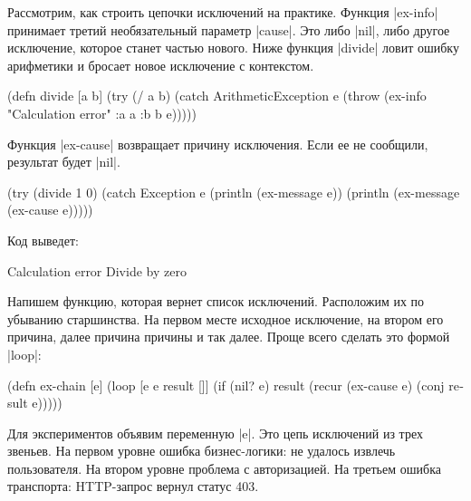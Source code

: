 Рассмотрим, как строить цепочки исключений на практике. Функция \spverb|ex-info|
принимает третий необязательный параметр \spverb|cause|. Это либо \spverb|nil|,
либо другое исключение, которое станет частью нового. Ниже функция
\spverb|divide| ловит ошибку арифметики и бросает новое исключение с контекстом.

\label{re-throw-example}

\begin{english}
  \begin{clojure}
(defn divide [a b]
  (try
    (/ a b)
    (catch ArithmeticException e
      (throw (ex-info
              "Calculation error"
              {:a a :b b}
              e)))))
  \end{clojure}
\end{english}

Функция \spverb|ex-cause| возвращает причину исключения. Если ее не сообщили,
результат будет \spverb|nil|.

\begin{english}
  \begin{clojure}
(try
  (divide 1 0)
  (catch Exception e
    (println (ex-message e))
    (println (ex-message (ex-cause e)))))
  \end{clojure}
\end{english}

\noindent
Код выведет:

\begin{english}
  \begin{text}
Calculation error
Divide by zero
  \end{text}
\end{english}

Напишем функцию, которая вернет список исключений. Расположим их по убыванию
старшинства. На первом месте исходное исключение, на втором его причина, далее
причина причины и так далее. Проще всего сделать это формой \spverb|loop|:

\begin{english}
  \begin{clojure}
(defn ex-chain [e]
  (loop [e e
         result []]
    (if (nil? e)
      result
      (recur (ex-cause e) (conj result e)))))
  \end{clojure}
\end{english}

Для экспериментов объявим переменную \spverb|e|. Это цепь исключений из трех
звеньев. На первом уровне ошибка бизнес-логики: не удалось извлечь
пользователя. На втором уровне проблема с авторизацией. На третьем ошибка
транспорта: HTTP-запрос вернул статус 403.

